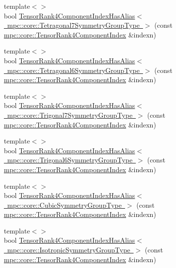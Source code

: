 \begin{DoxyCompactItemize}
\item 
{\footnotesize template$<$$>$ }\\bool \mbox{\hyperlink{namespacempc_1_1core_a79394263f68305a5f487a7c11a7efc6a}{Tensor\+Rank4\+Component\+Index\+Has\+Alias$<$ mpc\+::core\+::\+Tetragonal7\+Symmetry\+Group\+Type $>$}} (const \mbox{\hyperlink{namespacempc_1_1core_a54c081f41b2475abd10182bf023805d2}{mpc\+::core\+::\+Tensor\+Rank4\+Component\+Index}} \&indexn)
\item 
{\footnotesize template$<$$>$ }\\bool \mbox{\hyperlink{namespacempc_1_1core_aba63aa9beb5dc6209ec0e316f0cbc47a}{Tensor\+Rank4\+Component\+Index\+Has\+Alias$<$ mpc\+::core\+::\+Tetragonal6\+Symmetry\+Group\+Type $>$}} (const \mbox{\hyperlink{namespacempc_1_1core_a54c081f41b2475abd10182bf023805d2}{mpc\+::core\+::\+Tensor\+Rank4\+Component\+Index}} \&indexn)
\item 
{\footnotesize template$<$$>$ }\\bool \mbox{\hyperlink{namespacempc_1_1core_a1c36195d71aecc462b7e46921d63e9ce}{Tensor\+Rank4\+Component\+Index\+Has\+Alias$<$ mpc\+::core\+::\+Trigonal7\+Symmetry\+Group\+Type $>$}} (const \mbox{\hyperlink{namespacempc_1_1core_a54c081f41b2475abd10182bf023805d2}{mpc\+::core\+::\+Tensor\+Rank4\+Component\+Index}} \&indexn)
\item 
{\footnotesize template$<$$>$ }\\bool \mbox{\hyperlink{namespacempc_1_1core_a02a7ba547c1a761d2b90905c0a6a8059}{Tensor\+Rank4\+Component\+Index\+Has\+Alias$<$ mpc\+::core\+::\+Trigonal6\+Symmetry\+Group\+Type $>$}} (const \mbox{\hyperlink{namespacempc_1_1core_a54c081f41b2475abd10182bf023805d2}{mpc\+::core\+::\+Tensor\+Rank4\+Component\+Index}} \&indexn)
\item 
{\footnotesize template$<$$>$ }\\bool \mbox{\hyperlink{namespacempc_1_1core_aff2e1f4d3192240dd5dcb7a6a37d5edd}{Tensor\+Rank4\+Component\+Index\+Has\+Alias$<$ mpc\+::core\+::\+Cubic\+Symmetry\+Group\+Type $>$}} (const \mbox{\hyperlink{namespacempc_1_1core_a54c081f41b2475abd10182bf023805d2}{mpc\+::core\+::\+Tensor\+Rank4\+Component\+Index}} \&indexn)
\item 
{\footnotesize template$<$$>$ }\\bool \mbox{\hyperlink{namespacempc_1_1core_a43b1363c53c73157fd5344004173d0be}{Tensor\+Rank4\+Component\+Index\+Has\+Alias$<$ mpc\+::core\+::\+Isotropic\+Symmetry\+Group\+Type $>$}} (const \mbox{\hyperlink{namespacempc_1_1core_a54c081f41b2475abd10182bf023805d2}{mpc\+::core\+::\+Tensor\+Rank4\+Component\+Index}} \&indexn)

\end{DoxyCompactItemize}
